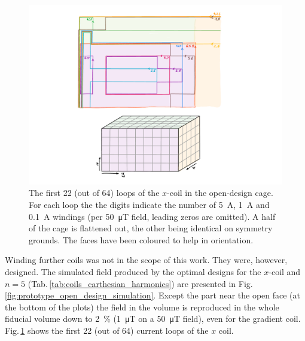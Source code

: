 \begin{figure}
  \centering
  \includegraphics[width=\linewidth]{gfx/prototype/open_design_Xcoil_coils.pdf}
  \caption{The first 22 (out of 64) loops of the $x$-coil in the open-design cage. For each loop the the digits indicate the number of \SI{5}{\ampere}, \SI{1}{\ampere} and \SI{0.1}{\ampere} windings (per \SI{50}{\micro\tesla} field, leading zeros are omitted). A half of the cage is flattened out, the other being identical on symmetry grounds. The faces have been coloured to help in orientation.}\label{fig:prototype_open_design_Xcoil_coils}
\end{figure}

Winding further coils was not in the scope of this work. They were, however, designed. The simulated field produced by the optimal designs for the $x$-coil and $n = 5$ (Tab.\,\ref{tab:coils_carthesian_harmonics}) are presented in Fig.\,\ref{fig:prototype_open_design_simulation}. Except the part near the open face (at the bottom of the plots) the field in the volume is reproduced in the whole fiducial volume down to \SI{2}{\percent} (\SI{1}{\micro\tesla} on a \SI{50}{\micro\tesla} field), even for the gradient coil.
Fig.\,\ref{fig:prototype_open_design_Xcoil_coils} shows the first 22 (out of 64) current loops of the $x$ coil.


